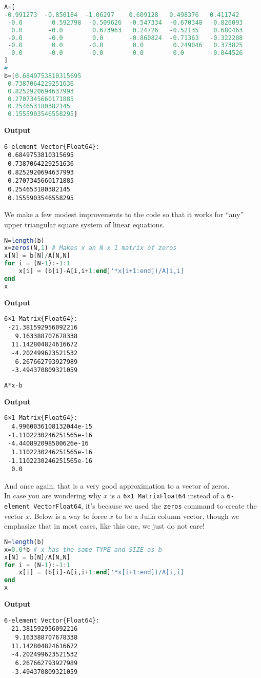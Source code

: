 \begin{lstlisting}[language=Julia,style=mystyle]
A=[
-0.991273  -0.850184  -1.06297    0.609128   0.498376   0.411742
 -0.0        0.592798  -0.509626  -0.547334  -0.670348  -0.826093
  0.0       -0.0        0.673963   0.24726   -0.52135    0.680463
 -0.0       -0.0        0.0       -0.860824  -0.71363   -0.322208
 -0.0        0.0       -0.0        0.0        0.249046   0.373825
  0.0       -0.0       -0.0        0.0        0.0       -0.044526
]
#
b=[0.6849753810315695
 0.7387064229251636
 0.8252920694637993
 0.2707345660171885
 0.254653180382145
 0.1555903546558295]
\end{lstlisting}
\textbf{Output} 
\begin{verbatim}
6-element Vector{Float64}:
 0.6849753810315695
 0.7387064229251636
 0.8252920694637993
 0.2707345660171885
 0.254653180382145
 0.1555903546558295
\end{verbatim}

We make a few modest improvements to the code so that it works for ``any'' upper triangular square system of linear equations.
\begin{lstlisting}[language=Julia,style=mystyle]
N=length(b)
x=zeros(N,1) # Makes x an N x 1 matrix of zeros
x[N] = b[N]/A[N,N]
for i = (N-1):-1:1
    x[i] = (b[i]-A[i,i+1:end]'*x[i+1:end])/A[i,i]
end
x
\end{lstlisting}
\textbf{Output} 
\begin{verbatim}
6×1 Matrix{Float64}:
 -21.381592956092216
   9.163388707678338
  11.142804824616672
  -4.202499623521532
   6.267662793927989
  -3.494370809321059
\end{verbatim}


\begin{lstlisting}[language=Julia,style=mystyle]
A*x-b
\end{lstlisting}
\textbf{Output} 
\begin{verbatim}
6×1 Matrix{Float64}:
  4.9960036108132044e-15
 -1.1102230246251565e-16
 -4.440892098500626e-16
  1.1102230246251565e-16
 -1.1102230246251565e-16
  0.0
\end{verbatim}
And once again, that is a very good approximation to a vector of zeros.\\

In case you are wondering why $x$ is a \texttt{6×1\,Matrix{Float64}}
instead of a \texttt{6-element\,Vector{Float64}}, it's because we used the \texttt{zeros} command to create the vector $x$. Below is a way to force $x$ to be a Julia column vector, though we emphasize that in most cases, like this one, we just do not care!
\begin{lstlisting}[language=Julia,style=mystyle]
N=length(b)
x=0.0*b # x has the same TYPE and SIZE as b
x[N] = b[N]/A[N,N]
for i = (N-1):-1:1
    x[i] = (b[i]-A[i,i+1:end]'*x[i+1:end])/A[i,i]
end
x
\end{lstlisting}
\textbf{Output} 
\begin{verbatim}
6-element Vector{Float64}:
 -21.381592956092216
   9.163388707678338
  11.142804824616672
  -4.202499623521532
   6.267662793927989
  -3.494370809321059
\end{verbatim}

